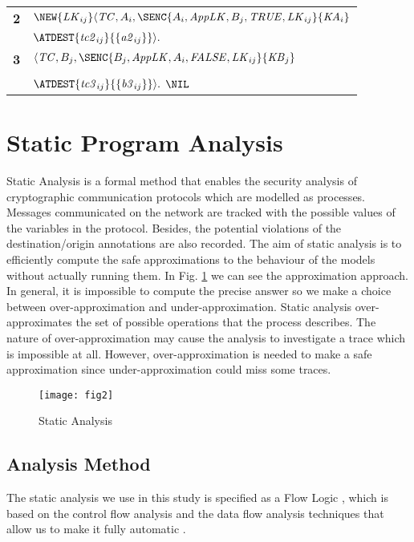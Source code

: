 \begin{table}
\begin{tabular}{l@{}l}
\textbf{2}   & $\NEW{\mathit{LK}_{i j}} \langle\mathit{TC}, A_{i}, \SENC{A_{i}, \mathit{AppLK}, B_{j}, \mathit{TRUE}, \mathit{LK}_{i j}}{\mathit{KA}_{i}}$\\
              & $\ATDEST{\mathit{tc2}_{i j}}{\{\mathit{a2}_{i j}\}}\rangle.$\\
\textbf{3}   & $\langle\mathit{TC}, B_{j}, \SENC{B_{j}, \mathit{AppLK}, A_{i}, \mathit{FALSE}, \mathit{LK}_{i j}}{\mathit{KB}_{j}}$\\
              & $\ATDEST{\mathit{tc3}_{i j}}{\{\mathit{b3}_{i j}\}}\rangle.$ $\NIL$\\
\hline
\end{tabular}
\end{table}

\section{Static Program Analysis}
\label{zig:static}
Static Analysis is a formal method that enables the security analysis of cryptographic communication protocols which are modelled as \LYSA processes. 
Messages communicated on the network are tracked with the possible values of the variables in the protocol. 
Besides, the potential violations of the destination/origin annotations are also recorded.
The aim of static analysis is to efficiently compute the safe approximations to the behaviour of the models without actually running them.
In Fig. \ref{fig:stat} we can see the approximation approach.
In general, it is impossible to compute the precise answer so we make a choice between over-approximation and under-approximation.
Static analysis over-approximates the set of possible operations that the \LYSA process describes.
The nature of over-approximation may cause the analysis to investigate a trace which is impossible at all.  
However, over-approximation is needed to make a safe approximation since under-approximation could miss some traces.

\begin{figure}[!htp]
\centering
\texttt{[image: fig2]}
\caption{Static Analysis}
\label{fig:stat}
\end{figure}

\subsection{Analysis Method}

The static analysis we use in this study is specified as a Flow Logic
\cite{bod:2,bod:1}, which is based on the control flow analysis and
the data flow analysis techniques that allow us to make it fully
automatic \cite{nie:nie:han}. 

